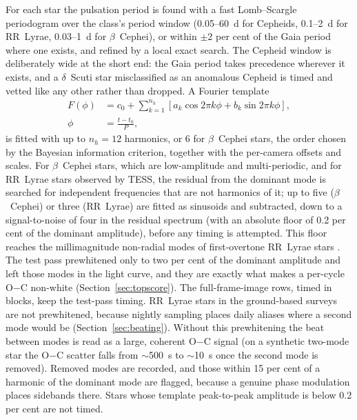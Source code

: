 \documentclass[final,5p]{elsarticle}
\newcommand{\oc}{O$-$C}
\newcommand{\bcep}{\ensuremath{\beta}~Cephei}
\begin{document}
For each star the pulsation period is found with a fast Lomb--Scargle periodogram \citep{Press1989} over the class's period window (0.05--60~d for Cepheids, 0.1--2~d for RR~Lyrae, 0.03--1~d for \bcep{}), or within $\pm2$ per cent of the Gaia period where one exists, and refined by a local exact search. The Cepheid window is deliberately wide at the short end: the Gaia period takes precedence wherever it exists, and a $\delta$~Scuti star misclassified as an anomalous Cepheid is timed and vetted like any other rather than dropped. A Fourier template
\begin{equation}
  \begin{aligned}
    F(\phi) &= c_0 + \sum_{k=1}^{n_h}\left[a_k\cos 2\pi k\phi + b_k\sin 2\pi k\phi\right], \\
    \phi &= \frac{t-t_0}{P},
  \end{aligned}
  \label{eq:template}
\end{equation}
is fitted with up to $n_h=12$ harmonics, or 6 for \bcep{} stars, the order chosen by the Bayesian information criterion, together with the per-camera offsets and scales. For \bcep{} stars, which are low-amplitude and multi-periodic, and for RR~Lyrae stars observed by TESS, the residual from the dominant mode is searched for independent frequencies that are not harmonics of it; up to five (\bcep{}) or three (RR~Lyrae) are fitted as sinusoids and subtracted, down to a signal-to-noise of four in the residual spectrum (with an absolute floor of 0.2 per cent of the dominant amplitude), before any timing is attempted. This floor reaches the millimagnitude non-radial modes of first-overtone RR~Lyrae stars \citep{Netzel2024}. The test pass prewhitened only to two per cent of the dominant amplitude and left those modes in the light curve, and they are exactly what makes a per-cycle \oc{} non-white (Section~\ref{sec:topscore}). The full-frame-image rows, timed in blocks, keep the test-pass timing. RR~Lyrae stars in the ground-based surveys are not prewhitened, because nightly sampling places daily aliases where a second mode would be (Section~\ref{sec:beating}). Without this prewhitening the beat between modes is read as a large, coherent \oc{} signal (on a synthetic two-mode star the \oc{} scatter falls from $\sim$500~s to $\sim$10~s once the second mode is removed). Removed modes are recorded, and those within 15 per cent of a harmonic of the dominant mode are flagged, because a genuine phase modulation places sidebands there. Stars whose template peak-to-peak amplitude is below 0.2 per cent are not timed.
\end{document}
